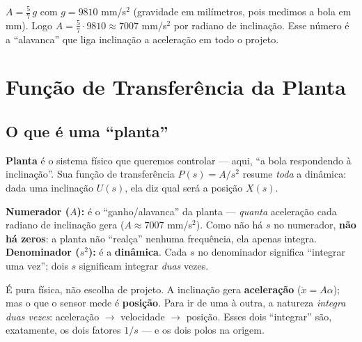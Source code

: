 \begin{projeto}
$A=\tfrac{5}{7}\,g$ com $g=9810$ mm/s$^2$ (gravidade em mil\'imetros, pois medimos
a bola em mm). Logo $A=\tfrac{5}{7}\cdot 9810 \approx 7007$ mm/s$^2$ por radiano de
inclina\c{c}\~ao. Esse n\'umero \'e a ``alavanca'' que liga inclina\c{c}\~ao a
acelera\c{c}\~ao em todo o projeto.
\end{projeto}

\chapter{Fun\c{c}\~ao de Transfer\^encia da Planta}\label{cap:ft}

\section{O que \'e uma ``planta''}
\textbf{Planta} \'e o sistema f\'isico que queremos controlar --- aqui, ``a bola
respondendo \`a inclina\c{c}\~ao''. Sua fun\c{c}\~ao de transfer\^encia
$P(s)=A/s^2$ resume \emph{toda} a din\^amica: dada uma inclina\c{c}\~ao $U(s)$, ela
diz qual ser\'a a posi\c{c}\~ao $X(s)$.

\begin{intuicao}[Lendo $P(s)=A/s^2$ por partes]
\textbf{Numerador ($A$):} \'e o ``ganho/alavanca'' da planta --- \emph{quanta}
acelera\c{c}\~ao cada radiano de inclina\c{c}\~ao gera ($A\approx7007$ mm/s$^2$).
Como n\~ao h\'a $s$ no numerador, \textbf{n\~ao h\'a zeros}: a planta n\~ao
``real\c{c}a'' nenhuma frequ\^encia, ela apenas integra.\\
\textbf{Denominador ($s^2$):} \'e a \textbf{din\^amica}. Cada $s$ no denominador
significa ``integrar uma vez''; dois $s$ significam integrar \emph{duas} vezes.
\end{intuicao}

\begin{intuicao}
\'E pura f\'isica, n\~ao escolha de projeto. A inclina\c{c}\~ao gera
\textbf{acelera\c{c}\~ao} ($\ddot x = A\alpha$); mas o que o sensor mede \'e
\textbf{posi\c{c}\~ao}. Para ir de uma \`a outra, a natureza \emph{integra duas
vezes}: acelera\c{c}\~ao $\to$ velocidade $\to$ posi\c{c}\~ao. Esses dois ``integrar''
s\~ao, exatamente, os dois fatores $1/s$ --- e os dois polos na origem.
\end{intuicao}


